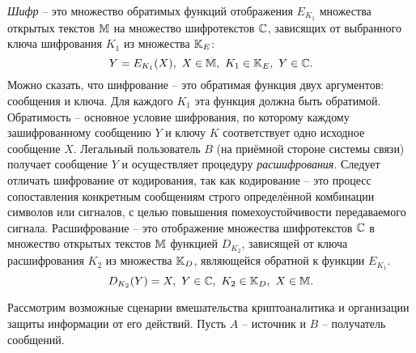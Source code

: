 \emph{Шифр} -- это множество обратимых функций отображения $E_{K_1}$ множества открытых текстов $\mathbb{M}$ на множество шифротекстов $\mathbb{C}$, зависящих от выбранного ключа шифрования $K_1$ из множества $\mathbb{K}_E$:
\begin{equation}
    \label{eq:Encryption}
    Y = E_{K_1}(X), ~ X \in \mathbb{M}, ~ K_1 \in \mathbb{K}_E, ~ Y \in \mathbb{C}.
\end{equation}
Можно сказать, что шифрование -- это обратимая функция двух аргументов: сообщения и ключа. Для каждого $K_1$ эта функция должна быть обратимой. Обратимость -- основное условие шифрования, по которому каждому зашифрованному сообщению $Y$ и ключу $K$ соответствует одно исходное сообщение $X$. Легальный пользователь $B$ (на приёмной стороне системы связи) получает сообщение $Y$ и осуществляет процедуру \emph{расшифрования}.
Следует отличать шифрование от кодирования, так как кодирование -- это процесс сопоставления конкретным сообщениям строго определённой комбинации символов или сигналов, с целью повышения помехоустойчивости передаваемого сигнала.
Расшифрование -- это отображение множества шифротекстов $\mathbb{C}$ в множество открытых текстов $\mathbb{M}$ функцией $D_{K_2}$, зависящей от ключа расшифрования $K_2$ из множества $\mathbb{K}_D$, являющейся обратной к функции $E_{K_1}$.
\begin{equation}
    \label{eq:Decryption}
    D_{K_2}(Y) = X, ~ Y \in \mathbb{C}, ~ K_2 \in \mathbb{K}_D, ~ X \in \mathbb{M}.
\end{equation}



Рассмотрим возможные сценарии вмешательства криптоаналитика и организации защиты информации от его действий.
Пусть $A$ -- источник и $B$ -- получатель сообщений.

